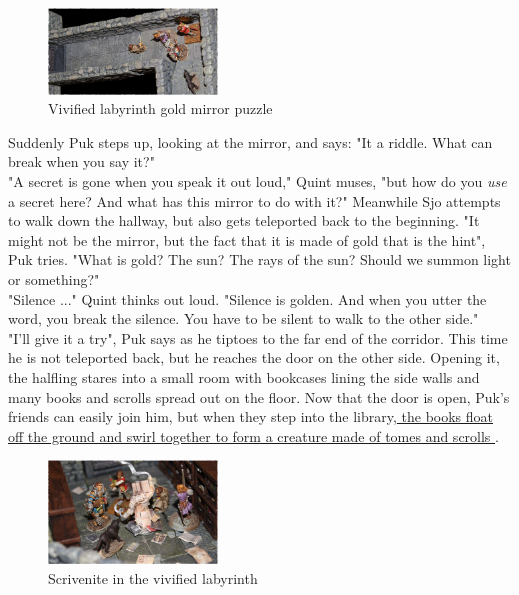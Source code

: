 \begin{figure}[h]
	\centering
	\includegraphics[width=0.4\textwidth]{images/Vivified-labyrinth-gold-mirror-puzzle-563931764_mod.jpg}
	\caption{Vivified labyrinth gold mirror puzzle}
	\label{fig:Vivified-labyrinth-gold-mirror-puzzle-563931764}
\end{figure}

Suddenly Puk steps up, looking at the mirror, and says: "It a riddle. What can break when you say it?"\\

"A secret is gone when you speak it out loud," Quint muses, "but how do you {\itshape use} a secret here? And what has this mirror to do with it?" Meanwhile Sjo attempts to walk down the hallway, but also gets teleported back to the beginning. "It might not be the mirror, but the fact that it is made of gold that is the hint", Puk tries. "What is gold? The sun? The rays of the sun? Should we summon light or something?"\\

"Silence ..." Quint thinks out loud. "Silence is golden. And when you utter the word, you break the silence. You have to be silent to walk to the other side."\\

"I'll give it a try", Puk says as he tiptoes to the far end of the corridor. This time he is not teleported back, but he reaches the door on the other side. Opening it, the halfling stares into a small room with bookcases lining the side walls and many books and scrolls spread out on the floor. Now that the door is open, Puk's friends can easily join him, but when they step into the library,\hyperref[fig:Scrivenite-in-the-vivified-labyrinth-563932189]{ the books float off the ground and swirl together to form a creature made of tomes and scrolls } . \\

\begin{figure}[h]
	\centering
	\includegraphics[width=0.4\textwidth]{images/Scrivenite-in-the-vivified-labyrinth-563932189_mod.jpg}
	\caption{Scrivenite in the vivified labyrinth}
	\label{fig:Scrivenite-in-the-vivified-labyrinth-563932189}
\end{figure}

